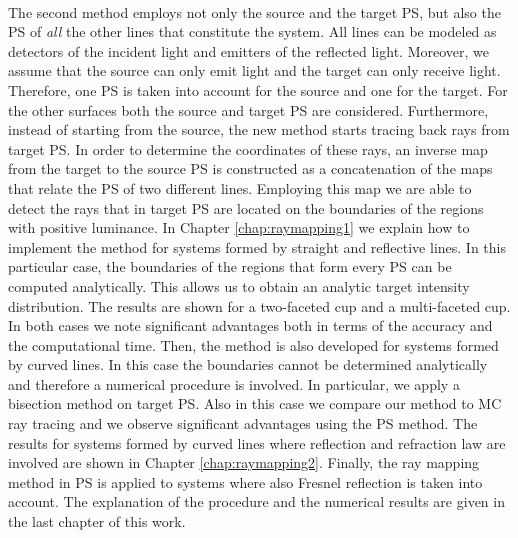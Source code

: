 \\ \indent The second method employs not only the source and the target PS, but also the PS of \textit{all} the other lines that constitute the system.
All lines can be modeled as detectors of the incident light and emitters of the reflected light.
Moreover, we assume that the source can only emit light and the target can only receive light.
Therefore, one PS is taken into account for the source and one for the target. For the other surfaces both the source and target PS are considered.
Furthermore, instead of starting from the source, the new method starts tracing back rays from target PS. 
In order to determine the coordinates of these rays, an inverse map from the target to the source PS is constructed as a concatenation of the maps that relate the PS of two different lines.
Employing this map we are able to detect the rays that in target PS are located on the boundaries of the regions with positive luminance. 
In Chapter \ref{chap:raymapping1} we explain how to implement the method for systems formed by straight and reflective lines. In this particular case, the boundaries of the regions that form every PS can be computed analytically. This allows us to obtain an analytic target intensity distribution. The results are shown for a two-faceted cup and a multi-faceted cup. In both cases we note significant advantages both in terms of the accuracy and the computational time. Then, the method is also developed for systems formed by curved lines. In this case the boundaries cannot be determined analytically and therefore a numerical procedure is involved. In particular, we apply a bisection method on target PS. Also in this case we compare our method to MC ray tracing and we observe significant advantages using the PS method. The results for systems formed by curved lines where reflection and refraction law are involved are shown in Chapter \ref{chap:raymapping2}. Finally, the ray mapping method in PS is applied to systems where also Fresnel reflection is taken into account. The explanation of the procedure and the numerical results are given in the last chapter of this work.
